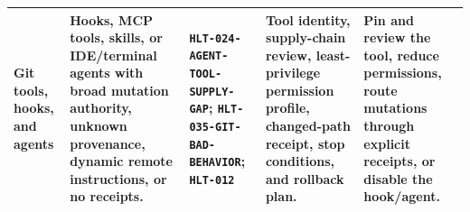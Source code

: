 \begin{longtable}{L{0.12\textwidth} L{0.23\textwidth} L{0.18\textwidth} L{0.24\textwidth} L{0.15\textwidth}}
Git tools, hooks, and agents & Hooks, MCP tools, skills, or IDE/terminal agents with broad mutation authority, unknown provenance, dynamic remote instructions, or no receipts. & \texttt{HLT-024-AGENT-TOOL-SUPPLY-GAP}; \texttt{HLT-035-GIT-BAD-BEHAVIOR}; \texttt{HLT-012} & Tool identity, supply-chain review, least-privilege permission profile, changed-path receipt, stop conditions, and rollback plan. & Pin and review the tool, reduce permissions, route mutations through explicit receipts, or disable the hook/agent. \\
\bottomrule
\end{longtable}
\normalsize
